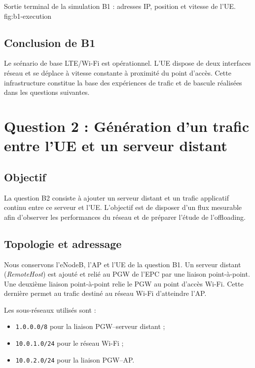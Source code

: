 {Sortie terminal de la simulation B1 : adresses IP, position et vitesse de l'UE.}
{fig:b1-execution}

\subsection{Conclusion de B1}

Le scénario de base LTE/Wi-Fi est opérationnel. L'UE dispose
de deux interfaces réseau et se déplace à vitesse constante
à proximité du point d'accès. Cette infrastructure constitue
la base des expériences de trafic et de bascule réalisées
dans les questions suivantes.

\section{Question 2 : Génération d'un trafic entre l'UE et un serveur distant}

\subsection{Objectif}

La question B2 consiste à ajouter un serveur distant et un
trafic applicatif continu entre ce serveur et l'UE. L'objectif
est de disposer d'un flux mesurable afin d'observer les
performances du réseau et de préparer l'étude de l'offloading.

\subsection{Topologie et adressage}

Nous conservons l'eNodeB, l'AP et l'UE de la question B1.
Un serveur distant (\textit{RemoteHost}) est ajouté et relié
au PGW de l'EPC par une liaison point-à-point. Une deuxième
liaison point-à-point relie le PGW au point d'accès Wi-Fi.
Cette dernière permet au trafic destiné au réseau Wi-Fi
d'atteindre l'AP.

Les sous-réseaux utilisés sont :
\begin{itemize}
    \item \texttt{1.0.0.0/8} pour la liaison PGW--serveur distant ;
    \item \texttt{10.0.1.0/24} pour le réseau Wi-Fi ;
    \item \texttt{10.0.2.0/24} pour la liaison PGW--AP.
\end{itemize}


